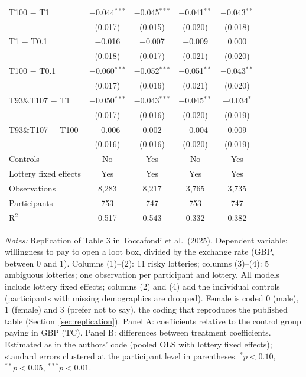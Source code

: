 \begin{table}[!t]
\begin{tabular}{lcccc}
T100 $-$ T1 & $-$0.044$^{***}$ & $-$0.045$^{***}$ & $-$0.041$^{**}$ & $-$0.043$^{**}$ \\
 & (0.017) & (0.015) & (0.020) & (0.018) \\
T1 $-$ T0.1 & $-$0.016 & $-$0.007 & $-$0.009 & 0.000 \\
 & (0.018) & (0.017) & (0.021) & (0.020) \\
T100 $-$ T0.1 & $-$0.060$^{***}$ & $-$0.052$^{***}$ & $-$0.051$^{**}$ & $-$0.043$^{**}$ \\
 & (0.017) & (0.016) & (0.021) & (0.020) \\
T93\&T107 $-$ T1 & $-$0.050$^{***}$ & $-$0.043$^{***}$ & $-$0.045$^{**}$ & $-$0.034$^{*}$ \\
 & (0.017) & (0.016) & (0.020) & (0.019) \\
T93\&T107 $-$ T100 & $-$0.006 & 0.002 & $-$0.004 & 0.009 \\
 & (0.016) & (0.016) & (0.020) & (0.019) \\
\midrule
Controls & No & Yes & No & Yes \\
Lottery fixed effects & Yes & Yes & Yes & Yes \\
Observations & 8,283 & 8,217 & 3,765 & 3,735 \\
Participants & 753 & 747 & 753 & 747 \\
R$^2$ & 0.517 & 0.543 & 0.332 & 0.382 \\
\bottomrule
\end{tabular}

\smallskip
\begin{minipage}{0.97\textwidth}\footnotesize
\emph{Notes:} Replication of Table 3 in Toccafondi et al.\ (2025). Dependent variable: willingness to pay to open a loot box, divided by the exchange rate (GBP, between 0 and 1). Columns (1)--(2): 11 risky lotteries; columns (3)--(4): 5 ambiguous lotteries; one observation per participant and lottery. All models include lottery fixed effects; columns (2) and (4) add the individual controls (participants with missing demographics are dropped). Female is coded 0 (male), 1 (female) and 3 (prefer not to say), the coding that reproduces the published table (Section~\ref{sec:replication}). Panel A: coefficients relative to the control group paying in GBP (TC). Panel B: differences between treatment coefficients. Estimated as in the authors' code (pooled OLS with lottery fixed effects); standard errors clustered at the participant level in parentheses. $^{*}p<0.10$, $^{**}p<0.05$, $^{***}p<0.01$.
\end{minipage}
\end{table}

